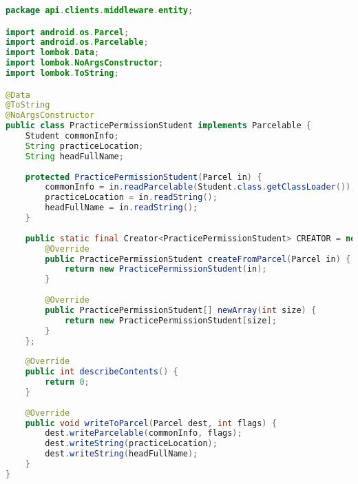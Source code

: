 \begin{lstlisting}[language=Java]
package api.clients.middleware.entity;

import android.os.Parcel;
import android.os.Parcelable;
import lombok.Data;
import lombok.NoArgsConstructor;
import lombok.ToString;

@Data
@ToString
@NoArgsConstructor
public class PracticePermissionStudent implements Parcelable {
	Student commonInfo;
	String practiceLocation;
	String headFullName;
	
	protected PracticePermissionStudent(Parcel in) {
		commonInfo = in.readParcelable(Student.class.getClassLoader());
		practiceLocation = in.readString();
		headFullName = in.readString();
	}
	
	public static final Creator<PracticePermissionStudent> CREATOR = new Creator<PracticePermissionStudent>() {
		@Override
		public PracticePermissionStudent createFromParcel(Parcel in) {
			return new PracticePermissionStudent(in);
		}
		
		@Override
		public PracticePermissionStudent[] newArray(int size) {
			return new PracticePermissionStudent[size];
		}
	};
	
	@Override
	public int describeContents() {
		return 0;
	}
	
	@Override
	public void writeToParcel(Parcel dest, int flags) {
		dest.writeParcelable(commonInfo, flags);
		dest.writeString(practiceLocation);
		dest.writeString(headFullName);
	}
}

\end{lstlisting}

